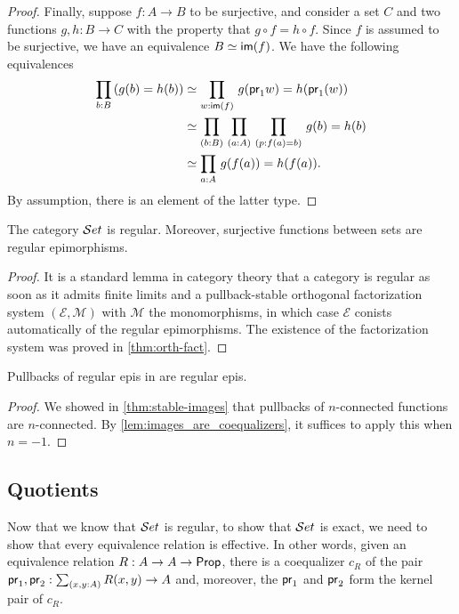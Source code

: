 \begin{proof}
Finally, suppose $f:A\to B$ to be surjective, and consider a set $C$ and two functions
$g,h:B\to C$ with the property that $g\circ f = h\circ f$. Since $f$ 
is assumed to be surjective,
we have an equivalence $B\simeq\mathsf{im}(f)$. We have the following equivalences
\begin{align*}
\prd{b:B} (g(b)= h(b))
& \simeq \prd{w:\im(f)} g(\proj1 w)= h(\proj1(w))\\
& \simeq \prd{b:B}{a:A}{p:f(a)= b} g(b)= h(b)\\
& \simeq \prd{a:A} g(f(a))= h(f(a)).
\end{align*}
By assumption, there is an element of the latter type.
\end{proof}


\begin{thm}\label{thm:set_regular}\label{lem:images_are_coequalizers}
The category $\mathcal{S}et$ is regular. Moreover, surjective functions between sets are regular epimorphisms.
\end{thm}

\begin{proof}
It is a standard lemma in category theory that a category is regular as soon as it admits finite limits and a pullback-stable orthogonal 
factorization system $(\mathcal{E},\mathcal{M})$ with $\mathcal{M}$ the monomorphisms, in which case $\mathcal{E}$ conists automatically of 
the regular epimorphisms. The existence of the factorization system was proved in \autoref{thm:orth-fact}.
\end{proof}

\begin{lem}\label{lem:pb_of_coeq_is_coeq}
Pullbacks of regular epis in \uset are regular epis.
\end{lem}
\begin{proof}
  We showed in \autoref{thm:stable-images} that pullbacks of $n$-connected functions are $n$-connected.
  By \autoref{lem:images_are_coequalizers}, it suffices to apply this when $n=-1$.
\end{proof}

\subsection{Quotients}\label{subsec:quotients}
Now that we know that $\mathcal{S}et$ is regular, to show that $\mathcal{S}et$ is exact, we need to show that every
equivalence relation is effective. In other words, given an equivalence
relation $R:A\to A\to\mathsf{Prop}$, there is a coequalizer $c_R$ of the pair
$\proj1,\proj2:\sm{x,y:A} R(x,y)\to A$ and, moreover, the $\mathsf{pr}_{1}$ and $\mathsf{pr}_{2}$
form the kernel pair of $c_R$.

